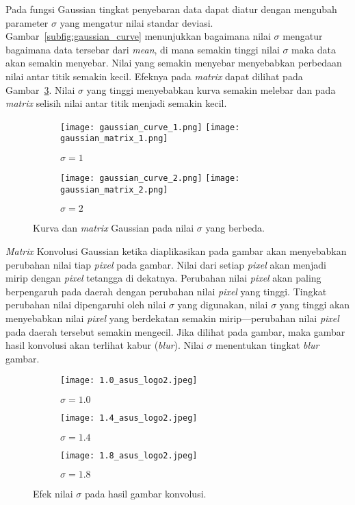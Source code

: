 Pada fungsi Gaussian tingkat penyebaran data dapat diatur dengan mengubah parameter $\sigma$ yang mengatur nilai standar deviasi. Gambar~\ref{subfig:gaussian_curve} menunjukkan bagaimana nilai $\sigma$ mengatur bagaimana data tersebar dari \textit{mean}, di mana semakin tinggi nilai $\sigma$ maka data akan semakin menyebar. Nilai yang semakin menyebar menyebabkan perbedaan nilai antar titik semakin kecil. Efeknya pada \textit{matrix} dapat dilihat pada Gambar~\ref{fig:gaussian_sigma}. Nilai $\sigma$ yang tinggi menyebabkan kurva semakin melebar dan pada \textit{matrix} selisih nilai antar titik menjadi semakin kecil.

\begin{figure}[H]
	\begin{subfigure}[b]{.5\textwidth}
		\centering
		\texttt{[image: gaussian\_curve\_1.png]}
		\texttt{[image: gaussian\_matrix\_1.png]}
		\caption{$\sigma=1$}
		\label{subfig:gaussian_sigma1}
	\end{subfigure}%
	\begin{subfigure}[b]{.5\textwidth}
		\centering
		\texttt{[image: gaussian\_curve\_2.png]}
		\texttt{[image: gaussian\_matrix\_2.png]}
		\caption{$\sigma=2$}
		\label{subfig:gaussian_sigma2}
	\end{subfigure}
	\caption{Kurva dan \textit{matrix} Gaussian pada nilai $\sigma$ yang berbeda.}
	\label{fig:gaussian_sigma}
\end{figure}

\textit{Matrix} Konvolusi Gaussian ketika diaplikasikan pada gambar akan menyebabkan perubahan nilai tiap \textit{pixel} pada gambar. Nilai dari setiap \textit{pixel} akan menjadi mirip dengan \textit{pixel} tetangga di dekatnya. Perubahan nilai \textit{pixel} akan paling berpengaruh pada daerah dengan perubahan nilai \textit{pixel} yang tinggi. Tingkat perubahan nilai dipengaruhi oleh nilai $\sigma$ yang digunakan, nilai $\sigma$ yang tinggi akan menyebabkan nilai \textit{pixel} yang berdekatan semakin mirip---perubahan nilai \textit{pixel} pada daerah tersebut semakin mengecil. Jika dilihat pada gambar, maka gambar hasil konvolusi akan terlihat kabur (\textit{blur}). Nilai $\sigma$ menentukan tingkat \textit{blur} gambar.

\begin{figure}[H]
	\centering
	\begin{subfigure}[b]{.33\textwidth}
		\centering
		\texttt{[image: 1.0\_asus\_logo2.jpeg]}
		\caption{$\sigma=1.0$}
		\label{subfig:asus_sigma1.0}
	\end{subfigure}%
	\begin{subfigure}[b]{.33\textwidth}
		\centering
		\texttt{[image: 1.4\_asus\_logo2.jpeg]}
		\caption{$\sigma=1.4$}
		\label{subfig:asus_sigma1.4}
	\end{subfigure}
	\begin{subfigure}[b]{.33\textwidth}
		\centering
		\texttt{[image: 1.8\_asus\_logo2.jpeg]}
		\caption{$\sigma=1.8$}
		\label{subfig:asus_sigma1.8}
	\end{subfigure}
	\caption{Efek nilai $\sigma$ pada hasil gambar konvolusi.}
	\label{fig:asus_konv}
\end{figure}

